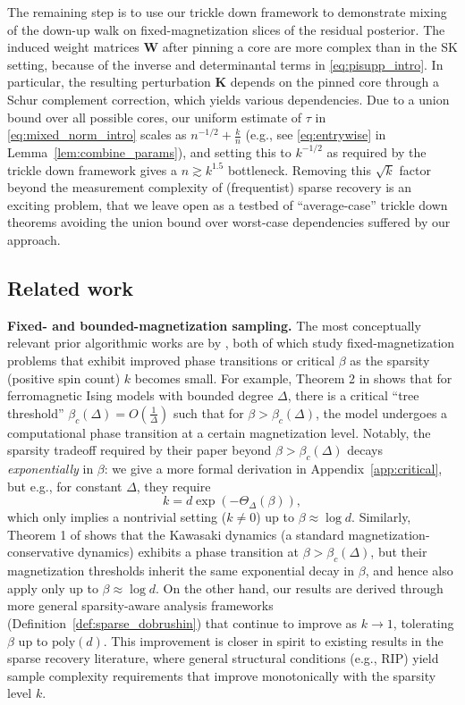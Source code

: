 \documentclass[11pt]{article}
\newcommand{\1}{\mathbf{1}}
\newcommand{\0}{\mathbf{0}}
\newcommand{\Par}[1]{\left(#1\right)}
\newcommand{\poly}{\mathrm{poly}}
\newcommand{\mk}{{\mathbf{K}}}
\newcommand{\mw}{{\mathbf{W}}}
\begin{document}
The remaining step is to use our trickle down framework to demonstrate mixing of the down-up walk on fixed-magnetization slices of the residual posterior. The induced weight matrices $\mw$ after pinning a core are more complex than in the SK setting, because of the inverse and determinantal terms in \eqref{eq:pisupp_intro}. In particular, the resulting perturbation $\mk$ depends on the pinned core through a Schur complement correction, which yields various dependencies. Due to a union bound over all possible cores, our uniform estimate of $\tau$ in \eqref{eq:mixed_norm_intro} scales as $n^{-1/2} + \frac k n$ (e.g., see \eqref{eq:entrywise} in Lemma~\ref{lem:combine_params}), and setting this to $k^{-1/2}$ as required by the trickle down framework gives a $n \gtrsim k^{1.5}$ bottleneck.
Removing this $\sqrt{k}$ factor beyond the measurement complexity of (frequentist) sparse recovery is an exciting problem, that we leave open as a testbed of ``average-case'' trickle down theorems avoiding the union bound over worst-case dependencies suffered by our approach.

\subsection{Related work}\label{ssec:related}

\textbf{Fixed- and bounded-magnetization sampling.} The most conceptually relevant prior algorithmic works are by \cite{Carlson2022, KuchukovaPappikPerkinsYap2025}, both of which study fixed-magnetization problems that exhibit improved phase transitions or critical $\beta$ as the sparsity (positive spin count) $k$ becomes small. For example, Theorem 2 in \cite{Carlson2022} shows that for  ferromagnetic Ising models with bounded degree $\Delta$, there is a critical ``tree threshold'' $\beta_c(\Delta) = O(\frac 1 \Delta)$ such that for $\beta > \beta_c(\Delta)$, the model undergoes a computational phase transition at a certain magnetization level. Notably, the sparsity tradeoff required by their paper beyond $\beta > \beta_c(\Delta)$ decays \emph{exponentially} in $\beta$: we give a more formal derivation in Appendix~\ref{app:critical}, but e.g., for constant $\Delta$, they require
\[k = d \exp\Par{-\Theta_\Delta(\beta)},\]
which only implies a nontrivial setting ($k \neq 0$) up to $\beta \approx \log d$. Similarly, Theorem 1 of \cite{KuchukovaPappikPerkinsYap2025} shows that the Kawasaki dynamics \cite{Kawasaki66} (a standard magnetization-conservative dynamics) exhibits a phase transition at $\beta > \beta_c(\Delta)$, but their magnetization thresholds inherit the same exponential decay in $\beta$, and hence also apply only up to $\beta \approx \log d$. On the other hand, our results are derived through more general sparsity-aware analysis frameworks (Definition~\ref{def:sparse_dobrushin}) that continue to improve as $k \to 1$, tolerating $\beta$ up to $\poly(d)$. This improvement is closer in spirit to existing results in the sparse recovery literature, where general structural conditions (e.g., RIP) yield sample complexity requirements that improve monotonically with the sparsity level $k$.
\end{document}
